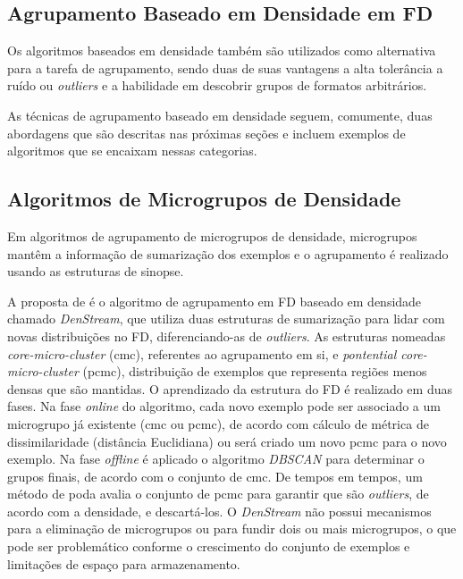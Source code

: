 \subsection{Agrupamento Baseado em Densidade em FD}

Os algoritmos baseados em densidade também são utilizados como alternativa para a tarefa de agrupamento, sendo duas de suas vantagens a alta tolerância a ruído ou \emph{outliers} e a habilidade em descobrir grupos de formatos arbitrários.

As técnicas de agrupamento baseado em densidade seguem, comumente, duas abordagens que são descritas nas próximas seções e incluem exemplos de algoritmos que se encaixam nessas categorias.

\subsection{Algoritmos de Microgrupos de Densidade}

Em algoritmos de agrupamento de microgrupos de densidade, microgrupos mantêm a informação de sumarização dos exemplos e o agrupamento é realizado usando as estruturas de sinopse.

A proposta de  é o algoritmo de agrupamento em FD baseado em densidade chamado \emph{DenStream}, que utiliza duas estruturas de sumarização para lidar com novas distribuições no FD, diferenciando-as de \emph{outliers}. As estruturas nomeadas \emph{core-micro-cluster} (cmc), referentes ao agrupamento em si, e \emph{pontential core-micro-cluster} (pcmc), distribuição de exemplos que representa regiões menos densas que são mantidas. O aprendizado da estrutura do FD é realizado em duas fases. Na fase \emph{online} do algoritmo, cada novo exemplo pode ser associado a um microgrupo já existente (cmc ou pcmc), de acordo com cálculo de métrica de dissimilaridade (distância Euclidiana) ou será criado um novo pcmc para o novo exemplo. Na fase \emph{offline} é aplicado o algoritmo \emph{DBSCAN} \cite{Ester1996} para determinar o grupos finais, de acordo com o conjunto de cmc. De tempos em tempos, um método de poda avalia o conjunto de pcmc para garantir que são \emph{outliers}, de acordo com a densidade, e descartá-los. O \emph{DenStream} não possui mecanismos para a eliminação de microgrupos ou para fundir dois ou mais microgrupos, o que pode ser problemático conforme o crescimento do conjunto de exemplos e limitações de espaço para armazenamento.

